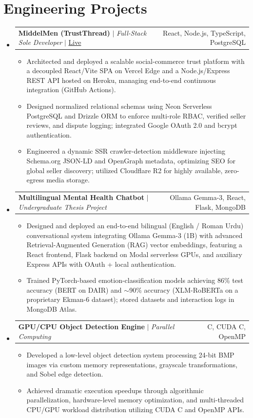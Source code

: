 \documentclass[letterpaper,11pt]{article}
\newcommand{\resumeItem}[1]{
  \item\small{
    {#1 \vspace{-2pt}}
  }
}
\newcommand{\resumeProjectHeading}[2]{
    \item
    \begin{tabularx}{0.97\textwidth}{X r}
      \small#1 & \small #2 \\
    \end{tabularx}\vspace{-6pt}
}
\newcommand{\resumeSubHeadingListStart}{\begin{itemize}[leftmargin=0.15in, label={}]}
\newcommand{\resumeSubHeadingListEnd}{\end{itemize}}
\newcommand{\resumeItemListStart}{\begin{itemize}[leftmargin=0.18in, itemsep=1pt]}
\newcommand{\resumeItemListEnd}{\end{itemize}\vspace{-5pt}}
\begin{document}
\section{Engineering Projects}
    \resumeSubHeadingListStart
      \resumeProjectHeading
          {\textbf{MiddelMen (TrustThread)} $|$ \emph{Full-Stack Sole Developer} $|$ \href{https://www.middelmen.com}{Live}}{React, Node.js, TypeScript, PostgreSQL}
        \resumeItemListStart
          \resumeItem{Architected and deployed a scalable social-commerce trust platform with a decoupled React/Vite SPA on Vercel Edge and a Node.js/Express REST API hosted on Heroku, managing end-to-end continuous integration (GitHub Actions).}
          \resumeItem{Designed normalized relational schemas using Neon Serverless PostgreSQL and Drizzle ORM to enforce multi-role RBAC, verified seller reviews, and dispute logging; integrated Google OAuth 2.0 and bcrypt authentication.}
          \resumeItem{Engineered a dynamic SSR crawler-detection middleware injecting Schema.org JSON-LD and OpenGraph metadata, optimizing SEO for global seller discovery; utilized Cloudflare R2 for highly available, zero-egress media storage.}
        \resumeItemListEnd

      \resumeProjectHeading
          {\textbf{Multilingual Mental Health Chatbot} $|$ \emph{Undergraduate Thesis Project}}{Ollama Gemma-3, React, Flask, MongoDB}
        \resumeItemListStart
          \resumeItem{Designed and deployed an end-to-end bilingual (English / Roman Urdu) conversational system integrating Ollama Gemma-3 (1B) with advanced Retrieval-Augmented Generation (RAG) vector embeddings, featuring a React frontend, Flask backend on Modal serverless GPUs, and auxiliary Express APIs with OAuth + local authentication.}
          \resumeItem{Trained PyTorch-based emotion-classification models achieving 86\% test accuracy (BERT on DAIR) and $\sim$90\% accuracy (XLM-RoBERTa on a proprietary Ekman-6 dataset); stored datasets and interaction logs in MongoDB Atlas.}
        \resumeItemListEnd

      \resumeProjectHeading
          {\textbf{GPU/CPU Object Detection Engine} $|$ \emph{Parallel Computing}}{C, CUDA C, OpenMP}
        \resumeItemListStart
          \resumeItem{Developed a low-level object detection system processing 24-bit BMP images via custom memory representations, grayscale transformations, and Sobel edge detection.}
          \resumeItem{Achieved dramatic execution speedups through algorithmic parallelization, hardware-level memory optimization, and multi-threaded CPU/GPU workload distribution utilizing CUDA C and OpenMP APIs.}
        \resumeItemListEnd
    \resumeSubHeadingListEnd
\end{document}
